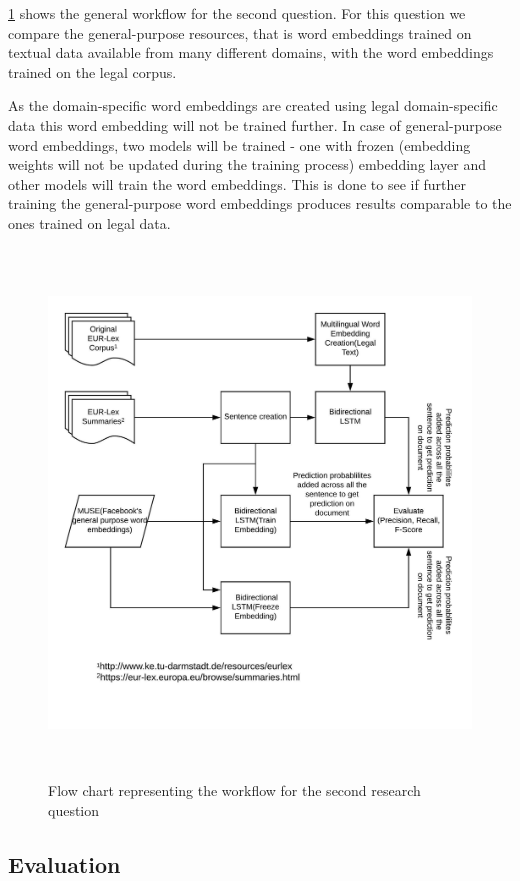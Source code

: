 \ref{fig:FlowResearchQuestion2} shows the general workflow for the second question. For this question we compare the general-purpose resources, that is word embeddings trained on textual data available from many different domains, with the word embeddings trained on the legal corpus. 

As the domain-specific word embeddings are created using legal domain-specific data this word embedding will not be trained further. In case of general-purpose word embeddings, two models will be trained - one with frozen (embedding weights will not be updated during the training process) embedding layer and other models will train the word embeddings. This is done to see if further training the general-purpose word embeddings produces results comparable to the ones trained on legal data.
\begin{figure}[!ht]
    \centering
    \includegraphics[width=15cm, height=14cm,keepaspectratio]{pics/flowforQuestion2.jpeg}
    \captionsetup{justification=centering,margin=1cm}
    \caption{Flow chart representing the workflow for the second research question}
    \label{fig:FlowResearchQuestion2}
\end{figure}

\subsection*{Evaluation}

